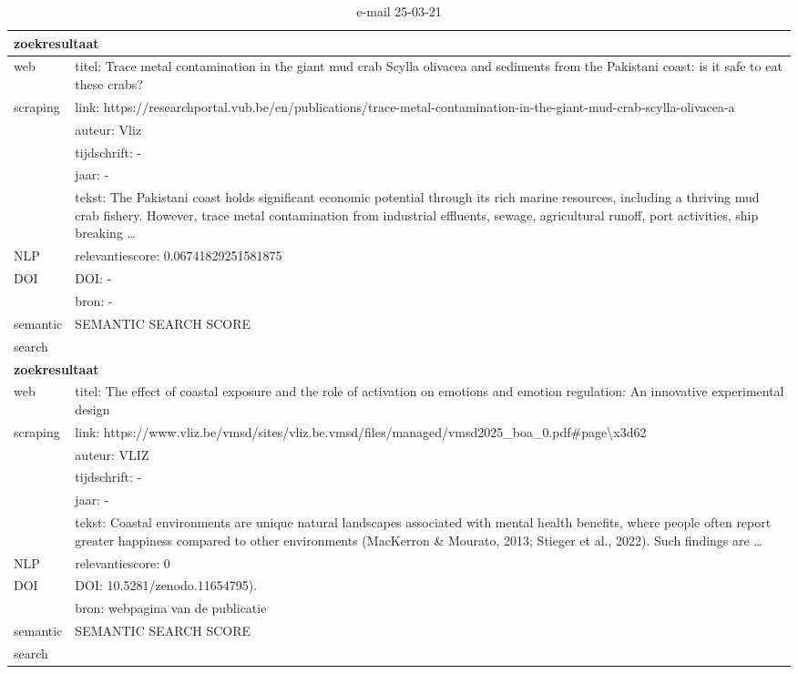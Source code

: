 \begin{table}[h!]
    \caption{e-mail 25-03-21}
    \centering
    \begin{tabularx}{\textwidth}{|p{4cm}|X|} 
        \hline
        \multicolumn{2}{|X|}{\textbf{zoekresultaat}} \\
        \hline
        web &titel: Trace metal contamination in the giant mud crab Scylla olivacea and sediments from the Pakistani coast: is it safe to eat these crabs?\\
        scraping&link: https://researchportal.vub.be/en/publications/trace-metal-contamination-in-the-giant-mud-crab-scylla-olivacea-a\\
        &auteur: Vliz\\
        &tijdschrift: -\\
        &jaar: -\\
        &tekst: The Pakistani coast holds significant economic potential through its rich marine resources, including a thriving mud crab fishery. However, trace metal contamination from industrial effluents, sewage, agricultural runoff, port activities, ship breaking …\\
        \hline
        NLP&relevantiescore: 0.06741829251581875\\
        \hline
        DOI&DOI: -\\
        &bron: -\\
        \hline
        semantic&SEMANTIC SEARCH SCORE\\
        search&\\
        \hline
        \multicolumn{2}{|X|}{\textbf{zoekresultaat}} \\
        \hline
        web &titel: The effect of coastal exposure and the role of activation on emotions and emotion regulation: An innovative experimental design\\
        scraping&link: https://www.vliz.be/vmsd/sites/vliz.be.vmsd/files/managed/vmsd2025\_boa\_0.pdf#page\textbackslash x3d62\\
         &auteur: VLIZ\\
        &tijdschrift: -\\
        &jaar: -\\
        &tekst: Coastal environments are unique natural landscapes associated with mental health benefits, where people often report greater happiness compared to other environments (MacKerron \& Mourato, 2013; Stieger et al., 2022). Such findings are …\\
        \hline
        NLP&relevantiescore: 0\\
        \hline
        DOI&DOI: 10.5281/zenodo.11654795).\\
        &bron: webpagina van de publicatie\\
        \hline
        semantic&SEMANTIC SEARCH SCORE\\
        search&\\
        \hline
    \end{tabularx}
    \label{table:email20250321}
\end{table}
